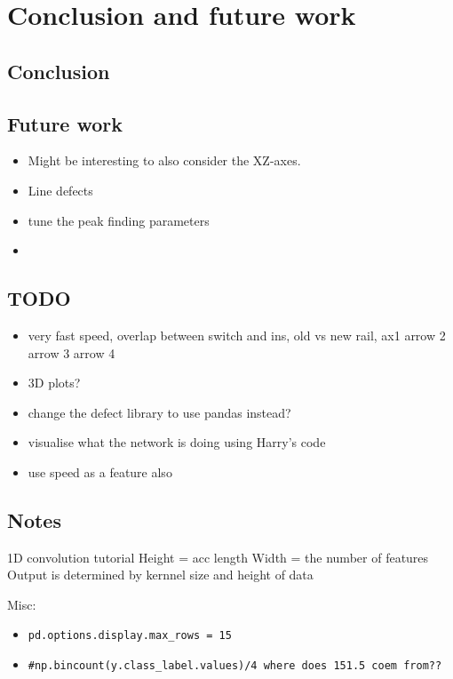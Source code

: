 \chapter{Conclusion and future work}

\section{Conclusion}

\section{Future work}

\begin{itemize}
	\item Might be interesting to also consider the XZ-axes.
	\item Line defects
	\item tune the peak finding parameters
\end{itemize}

\begin{itemize}
	\item 
\end{itemize}


\newpage
\section{TODO}
\begin{itemize}
	\item very fast speed, overlap between switch and ins, old vs new rail, ax1 arrow 2 arrow 3 arrow 4
	\item 3D plots?
	\item change the defect library to use pandas instead?
	\item visualise what the network is doing using Harry's code
	\item use speed as a feature also
\end{itemize}


\newpage
\section{Notes}
1D convolution tutorial
Height = acc length
Width = the number of features
Output is determined by kernnel size and height of data

Misc:
\begin{itemize}
	\item \verb|pd.options.display.max_rows = 15|
	\item \verb|#np.bincount(y.class_label.values)/4 where does 151.5 coem from??|
\end{itemize}

